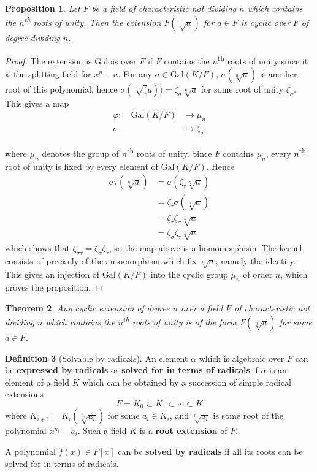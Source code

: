 \documentclass[10pt, oneside, reqno]{amsart}
\theoremstyle{plain}%
\newtheorem{thm}{Theorem}[section]
\newtheorem{prop}[thm]{Proposition}
\theoremstyle{definition}
\newtheorem{defn}[thm]{Definition}
\theoremstyle{remark}
\newcommand{\al}{\alpha}
\newcommand{\gal}[2]{\text{Gal}(#1/#2)}
\newcommand{\mapping}[5]{\begin{align*}
	#1 : \quad     #2 &\rightarrow #3 \\
			#4  &\mapsto #5
\end{align*}	
}
\begin{document}
\begin{prop}
	Let $F$ be a field of characteristic not dividing $n$ which contains the $n$\textsuperscript{th} roots of unity.  Then the extension $F(\sqrt[n]{a})$ for $a \in F$ is cyclic over $F$ of degree dividing $n$.
\end{prop}
\begin{proof}
	The extension is Galois over $F$ if $F$ contains the $n$\textsuperscript{th} roots of unity since it is the splitting field for $x^n - a$.  For any $\sigma \in \gal{K}{F}$, $\sigma(\sqrt[n]{a})$ is another root of this polynomial, hence $\sigma(\sqrt[n](a)) = \zeta_\sigma \sqrt[n]{a}$ for some root of unity $\zeta_\sigma$.  This gives a map \mapping{\varphi}{\gal{K}{F}}{\mu_n}{\sigma}{\zeta_\sigma}
	where $\mu_n$ denotes the group of $n$\textsuperscript{th} roots of unity.  Since $F$ contains $\mu_n$, every $n$\textsuperscript{th} root of unity is fixed by every element of $\gal{K}{F}$.  Hence \begin{align*}
		\sigma \tau (\sqrt[n]{a}) &= \sigma(\zeta_\tau \sqrt[n]{a}) \\
									&= \zeta_\tau \sigma(\sqrt[n]{a}) \\
									&= \zeta_\tau \zeta_\sigma \sqrt[n]{a} \\
									&= \zeta_\sigma \zeta_\tau \sqrt[n]{a}
	\end{align*}
	which shows that $\zeta_{\sigma \tau} = \zeta_\sigma \zeta_\tau$, so the map above is a homomorphism.  The kernel consists of precisely of the automorphism which fix $\sqrt[n]{a}$, namely the identity.  This gives an injection of $\gal{K}{F}$ into the cyclic group $\mu_n$ of order $n$, which proves the proposition.
\end{proof}

\begin{thm}
	Any cyclic extension of degree $n$ over a field $F$ of characteristic not dividing $n$ which contains the $n$\textsuperscript{th} roots of unity is of the form $F(\sqrt[n]{a})$ for some $a \in F$.
\end{thm}

\begin{defn}[Solvable by radicals]
	An element $\al$ which is algebraic over $F$ can be \textbf{expressed by radicals} or \textbf{solved for in terms of radicals} if $\alpha$ is an element of a field $K$ which can be obtained by a succession of simple radical extensions
\[
	F = K_0 \subset K_1 \subset \cdots \subset K
\]
where $K_{i+1} = K_i(\sqrt[n_i]{a_i})$ for some $a_i \in K_i$, and $\sqrt[n_i]{a_i}$ is some root of the polynomial $x^{n_i} - a_i$.  Such a field $K$ is a \textbf{root extension} of $F$. 

A polynomial $f(x) \in F[x]$ can be \textbf{solved by radicals} if all its roots can be solved for in terms of radicals.
\end{defn}
\end{document}
